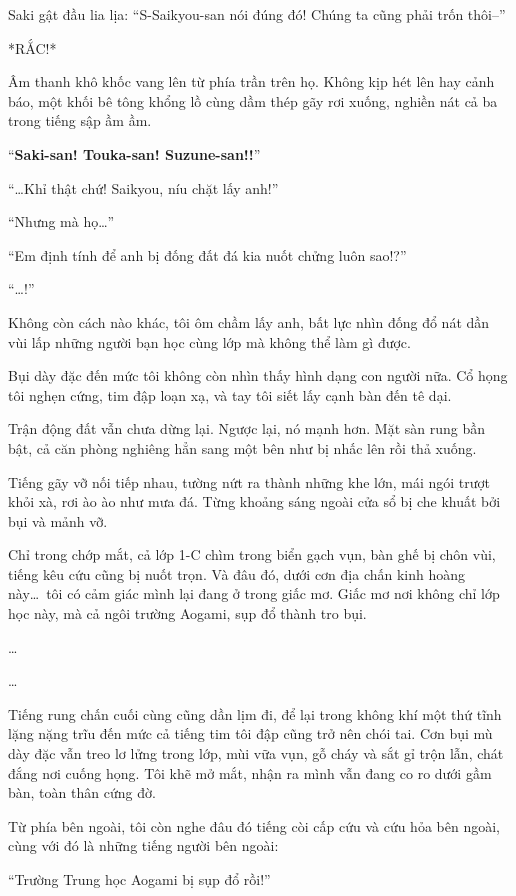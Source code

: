 \documentclass[../main.tex]{subfiles}
\begin{document}
Saki gật đầu lia lịa: ``S-Saikyou-san nói đúng đó! Chúng ta cũng phải trốn thôi--''

*RẮC!*

Âm thanh khô khốc vang lên từ phía trần trên họ. Không kịp hét lên hay cảnh báo, một khối bê tông khổng lồ cùng dầm thép gãy rơi xuống, nghiền nát cả ba trong tiếng sập ầm ầm.

``\textbf{Saki-san! Touka-san! Suzune-san!!}''

``\dots Khỉ thật chứ! Saikyou, níu chặt lấy anh!''

``Nhưng mà họ\dots''

``Em định tính để anh bị đống đất đá kia nuốt chửng luôn sao!?''

``\dots!''

Không còn cách nào khác, tôi ôm chầm lấy anh, bất lực nhìn đống đổ nát dần vùi lấp những người bạn học cùng lớp mà không thể làm gì được.

Bụi dày đặc đến mức tôi không còn nhìn thấy hình dạng con người nữa. Cổ họng tôi nghẹn cứng, tim đập loạn xạ, và tay tôi siết lấy cạnh bàn đến tê dại.

Trận động đất vẫn chưa dừng lại. Ngược lại, nó mạnh hơn. Mặt sàn rung bần bật, cả căn phòng nghiêng hẳn sang một bên như bị nhấc lên rồi thả xuống.

Tiếng gãy vỡ nối tiếp nhau, tường nứt ra thành những khe lớn, mái ngói trượt khỏi xà, rơi ào ào như mưa đá. Từng khoảng sáng ngoài cửa sổ bị che khuất bởi bụi và mảnh vỡ.

Chỉ trong chớp mắt, cả lớp 1-C chìm trong biển gạch vụn, bàn ghế bị chôn vùi, tiếng kêu cứu cũng bị nuốt trọn. Và đâu đó, dưới cơn địa chấn kinh hoàng này\dots\ tôi có cảm giác mình lại đang ở trong giấc mơ. Giấc mơ nơi không chỉ lớp học này, mà cả ngôi trường Aogami, sụp đổ thành tro bụi.

\ct

\dots

\dots

Tiếng rung chấn cuối cùng cũng dần lịm đi, để lại trong không khí một thứ tĩnh lặng nặng trĩu đến mức cả tiếng tim tôi đập cũng trở nên chói tai. Cơn bụi mù dày đặc vẫn treo lơ lửng trong lớp, mùi vữa vụn, gỗ cháy và sắt gỉ trộn lẫn, chát đắng nơi cuống họng. Tôi khẽ mở mắt, nhận ra mình vẫn đang co ro dưới gầm bàn, toàn thân cứng đờ.

Từ phía bên ngoài, tôi còn nghe đâu đó tiếng còi cấp cứu và cứu hỏa bên ngoài, cùng với đó là những tiếng người bên ngoài:

``Trường Trung học Aogami bị sụp đổ rồi!''
\end{document}
